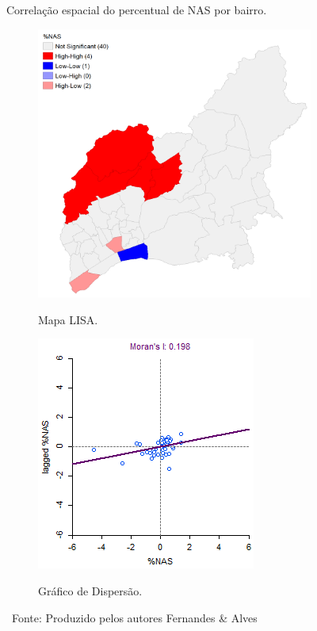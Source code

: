 \begin{figure}[htb]
     \caption{Correlação espacial do percentual de NAS por bairro.}
     \begin{subfigure}{.49\textwidth}
         \centering
         \caption{Mapa LISA.}
         \includegraphics[height=0.75\textwidth]{images/5_emp_bebidas/geoda/BairrosOSM_Corrigidos_NAS_lisa.png}
         \label{fig:AMBEV_LISA_NAS}
     \end{subfigure}
     \begin{subfigure}{.49\textwidth}
       \centering
       \caption{Gráfico de Dispersão.}
       \includegraphics[height=0.75\textwidth]{images/5_emp_bebidas/geoda/BairrosOSM_Corrigidos_NAS_sct.png}
       \label{fig:AMBEV_SCT_NAS}
     \end{subfigure}
     \caption*{\ Fonte: Produzido pelos autores Fernandes \& Alves}
 \end{figure} %

